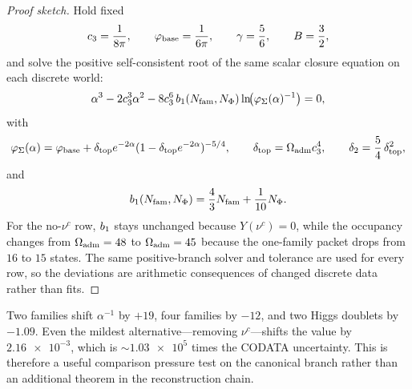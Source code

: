 \begin{proof}[Proof sketch]
Hold fixed
\[
c_3=\frac{1}{8\pi},
\qquad
\varphi_{\mathrm{base}}=\frac{1}{6\pi},
\qquad
\gamma=\frac56,
\qquad
B=\frac32,
\]
and solve the positive self-consistent root of the same scalar closure equation on each discrete world:
\[
\alpha^3-2c_3^3\alpha^2-8c_3^6\,b_1(N_{\mathrm{fam}},N_\Phi)\ln\!\bigl(\varphi_{\Sigma}(\alpha)^{-1}\bigr)=0,
\]
with
\[
\varphi_{\Sigma}(\alpha)=\varphi_{\mathrm{base}}+\delta_{\mathrm{top}} e^{-2\alpha}(1-\delta_{\mathrm{top}} e^{-2\alpha})^{-5/4},
\qquad
\delta_{\mathrm{top}}=\Omega_{\mathrm{adm}}c_3^4,
\qquad
\delta_2=\frac54\,\delta_{\mathrm{top}}^2,
\]
and
\[
b_1(N_{\mathrm{fam}},N_\Phi)=\frac43N_{\mathrm{fam}}+\frac1{10}N_\Phi.
\]
For the no-$\nu^c$ row, $b_1$ stays unchanged because $Y(\nu^c)=0$, while the occupancy changes from $\Omega_{\mathrm{adm}}=48$ to $\Omega_{\mathrm{adm}}=45$ because the one-family packet drops from $16$ to $15$ states. The same positive-branch solver and tolerance are used for every row, so the deviations are arithmetic consequences of changed discrete data rather than fits.
\end{proof}

\begin{remark}
Two families shift $\alpha^{-1}$ by $+19$, four families by $-12$, and two Higgs doublets by
$-1.09$. Even the mildest alternative---removing $\nu^c$---shifts the value by
$\num{2.16e-3}$, which is $\sim\num{1.03e5}$ times the CODATA uncertainty. This is therefore a
useful comparison pressure test on the canonical branch rather than an additional theorem in the
reconstruction chain.
\end{remark}

